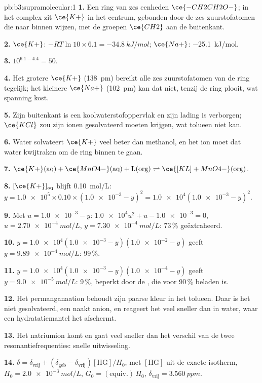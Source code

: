 \begin{solution}{pb:b3:supramolecular:1}
\textbf{1.} Een ring van zes eenheden $\ce{-CH2CH2O-}$; in het complex zit $\ce{K+}$ in het centrum, gebonden door de
zes zuurstofatomen die naar binnen wijzen, met de groepen $\ce{CH2}$ aan de buitenkant.

\textbf{2.} $\ce{K+}$: $-RT\ln 10 \times 6.1 = \qty{-34.8}{kJ/mol}$; $\ce{Na+}$: \qty{-25.1}{kJ/mol}.

\textbf{3.} $10^{6.1 - 4.4} = 50$.

\textbf{4.} Het grotere $\ce{K+}$ (\qty{138}{pm}) bereikt alle zes zuurstofatomen van de ring tegelijk; het
kleinere $\ce{Na+}$ (\qty{102}{pm}) kan dat niet, tenzij de ring plooit, wat spanning kost.

\textbf{5.} Zijn buitenkant is een koolwaterstofoppervlak en zijn lading
is verborgen; $\ce{KCl}$
zou zijn ionen gesolvateerd moeten krijgen, wat tolueen niet kan.

\textbf{6.} Water solvateert $\ce{K+}$ veel beter dan methanol, en het ion moet dat
water kwijtraken om de ring binnen te gaan.

\textbf{7.} $\ce{K+}(\text{aq}) + \ce{MnO4-}(\text{aq}) + \mathrm L(\text{org}) \rightleftharpoons \ce{[KL]+MnO4-}(\text{org})$.

\textbf{8.} $[\ce{K+}]_{\mathrm{aq}}$ blijft \qty{0.10}{mol/L}: $y = \num{1.0e5} \times 0.10 \times (\num{1.0e-3} - y)^2 = \num{1.0e4}(\num{1.0e-3} - y)^2$.

\textbf{9.} Met $u = \num{1.0e-3} - y$: $\num{1.0e4}u^2 + u - \num{1.0e-3} = 0$, $u = \qty{2.70e-4}{mol/L}$, $y = \qty{7.30e-4}{mol/L}$: 73\,\%
geëxtraheerd.

\textbf{10.} $y = \num{1.0e4}(\num{1.0e-3} - y)(\num{1.0e-2} - y)$ geeft $y = \qty{9.89e-4}{mol/L}$: 99\,\%.

\textbf{11.} $y = \num{1.0e4}(\num{1.0e-3} - y)(\num{1.0e-4} - y)$ geeft $y = \qty{9.0e-5}{mol/L}$: 9\,\%, beperkt door de ,
die voor 90\,\% beladen is.

\textbf{12.} Het permanganaation behoudt zijn paarse kleur in het tolueen.
Daar is het niet gesolvateerd, een naakt anion, en reageert het veel
sneller dan in water, waar een hydratatiemantel het afschermt.

\textbf{13.} Het natriumion komt en gaat veel sneller dan het verschil van
de twee resonantiefrequenties: snelle uitwisseling.

\textbf{14.} $\delta = \delta_{\mathrm{vrij}} + (\delta_{\mathrm{geb}} - \delta_{\mathrm{vrij}})[\mathrm{HG}]/H_0$, met $[\mathrm{HG}]$ uit de exacte isotherm, $H_0 = \qty{2.0e-3}{mol/L}$,
$G_0 = (\text{equiv.})\,H_0$, $\delta_{\mathrm{vrij}} = \qty{3.560}{ppm}$.


\end{solution}

